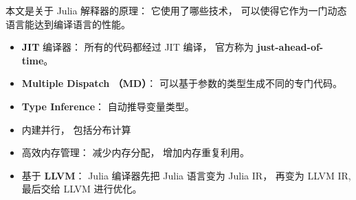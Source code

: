 
\begin{issues}
\issueDraft
\end{issues}

本文是关于 Julia 解释器的原理： 它使用了哪些技术， 可以使得它作为一门动态语言能达到编译语言的性能。

\begin{itemize}
\item \textbf{JIT} 编译器： 所有的代码都经过 JIT 编译， 官方称为 \textbf{just-ahead-of-time}。
\item \textbf{Multiple Dispatch （MD）}： 可以基于参数的类型生成不同的专门代码。
\item \textbf{Type Inference}： 自动推导变量类型。
\item 内建并行， 包括分布计算
\item 高效内存管理： 减少内存分配， 增加内存重复利用。
\item 基于 \textbf{LLVM}： Julia 编译器先把 Julia 语言变为 Julia IR， 再变为 LLVM IR, 最后交给 LLVM 进行优化。
\end{itemize}
